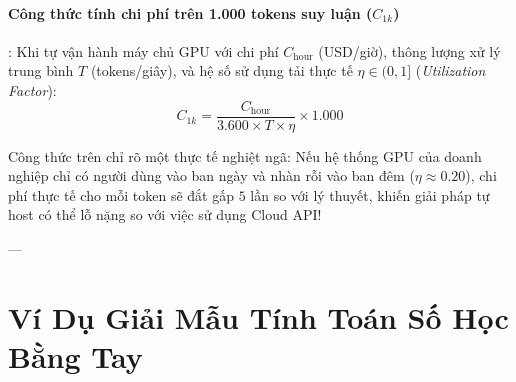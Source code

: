 \paragraph{Công thức tính chi phí trên 1.000 tokens suy luận ($C_{1k}$)}:
Khi tự vận hành máy chủ GPU với chi phí $C_{\text{hour}}$ (USD/giờ), thông lượng xử lý trung bình $T$ (tokens/giây), và hệ số sử dụng tải thực tế $\eta \in (0, 1]$ (\textit{Utilization Factor}):
\begin{equation}
C_{1k} = \frac{C_{\text{hour}}}{3.600 \times T \times \eta} \times 1.000
\label{eq:cost-per-1k-tokens}
\end{equation}

Công thức trên chỉ rõ một thực tế nghiệt ngã: Nếu hệ thống GPU của doanh nghiệp chỉ có người dùng vào ban ngày và nhàn rỗi vào ban đêm ($\eta \approx 0.20$), chi phí thực tế cho mỗi token sẽ đắt gấp $5$ lần so với lý thuyết, khiến giải pháp tự host có thể lỗ nặng so với việc sử dụng Cloud API!

---

\section{Ví Dụ Giải Mẫu Tính Toán Số Học Bằng Tay}
\label{sec:numerical-walkthrough}

